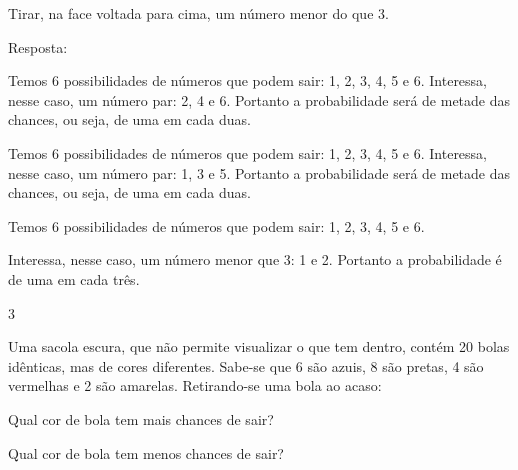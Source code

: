 \begin{escolha}
{\begin{escolha}
\begin{escolha}

\item
  Tirar, na face voltada para cima, um número menor do que 3.
\end{escolha}


Resposta:

\begin{escolha}

\item
  Temos 6 possibilidades de números que podem sair: 1, 2, 3, 4, 5 e 6.
  Interessa, nesse caso, um número par: 2, 4 e 6. Portanto a probabilidade será de metade das chances, ou seja, de uma em cada duas.
\end{escolha}

\begin{escolha}

\item
  Temos 6 possibilidades de números que podem sair: 1, 2, 3, 4, 5 e 6.
  Interessa, nesse caso, um número par: 1, 3 e 5. Portanto a probabilidade será de metade das chances, ou seja, de uma em cada duas.
\end{escolha}



\begin{escolha}

\item
  Temos 6 possibilidades de números que podem sair: 1, 2, 3, 4, 5 e 6.
\end{escolha}

Interessa, nesse caso, um número menor que 3: 1 e 2. Portanto a probabilidade é de uma em cada três.


\num{3}

Uma sacola escura, que não permite visualizar o que tem dentro, contém
20 bolas idênticas, mas de cores diferentes. Sabe-se que 6 são azuis, 8
são pretas, 4 são vermelhas e 2 são amarelas. Retirando-se uma bola ao
acaso:

\begin{escolha}

\item
Qual cor de bola tem mais chances de sair?

\item
 Qual cor de bola tem menos chances de sair?
\end{escolha}


\end{escolha}}
\end{escolha}
